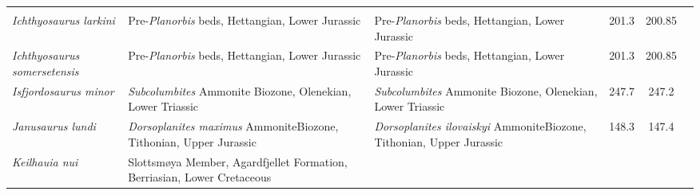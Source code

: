 \begin{longtabu}{>{\itshape}lXXSSl}
                                                             \cite{McGowan1974LSCROMa} \\                   
	Ichthyosaurus larkini                                &
        Pre-\emph{Planorbis} beds, Hettangian, Lower Jurassic
                                                             &
        Pre-\emph{Planorbis} beds, Hettangian, Lower Jurassic
                                                             & 201.3
                                                             & 200.85
                                                             & \cite{Lomax2017PP} \\                      
	Ichthyosaurus somersetensis                          &
        Pre-\emph{Planorbis} beds, Hettangian, Lower Jurassic
                                                             &
        Pre-\emph{Planorbis} beds, Hettangian, Lower Jurassic
                                                             & 201.3
                                                             & 200.85
                                                             & \cite{Lomax2017PP} \\                      
	Isfjordosaurus minor                                 &
        \emph{Subcolumbites} Ammonite Biozone, Olenekian, Lower Triassic
                                                             &
        \emph{Subcolumbites} Ammonite Biozone, Olenekian, Lower Triassic
                                                             & 247.7
                                                             & 247.2
                                                             &
                                                             \cite{Wiman1910BGIU} \\                      
	Janusaurus lundi                                     &
        \emph{Dorsoplanites maximus} AmmoniteBiozone, Tithonian, Upper Jurassic
                                                             &
        \emph{Dorsoplanites ilovaiskyi} AmmoniteBiozone, Tithonian, Upper
        Jurassic                                                         & 148.3
                                                                         & 147.4
                                                                         &
                                                                         \cite{Roberts2014PO} \\                    
	Keilhauia nui                                        & Slottsmøya
        Member, Agardfjellet Formation, Berriasian, Lower Cretaceous

\end{longtabu}
